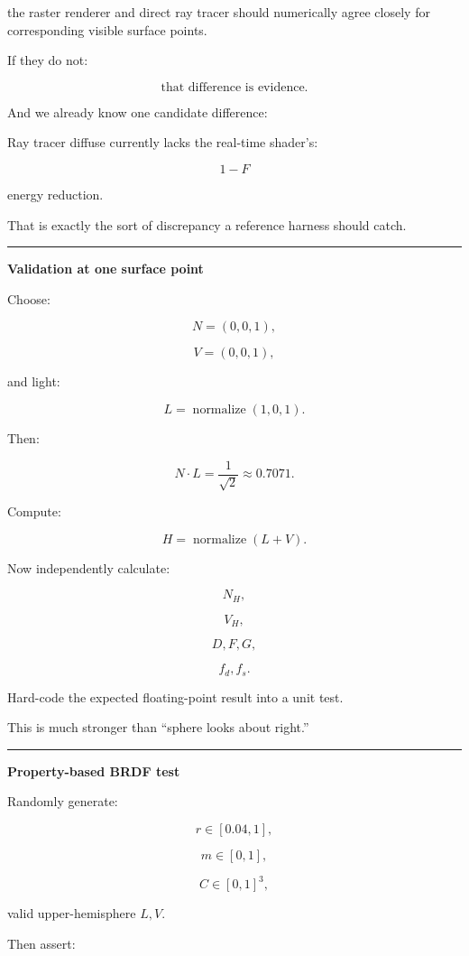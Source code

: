 the raster renderer and direct ray tracer should numerically agree closely for corresponding visible surface points.

If they do not:

\[
\boxed{
\text{that difference is evidence}.
}
\]

And we already know one candidate difference:

Ray tracer diffuse currently lacks the real-time shader's:

\[
1-F
\]

energy reduction.

That is exactly the sort of discrepancy a reference harness should catch.

\begin{center}\rule{0.5\linewidth}{0.5pt}\end{center}

\textbf{Validation at one surface point}

Choose:

\[
N=(0,0,1),
\]

\[
V=(0,0,1),
\]

and light:

\[
L=
\operatorname{normalize}(1,0,1).
\]

Then:

\[
N\cdot L
=
\frac1{\sqrt2}
\approx0.7071.
\]

Compute:

\[
H=
\operatorname{normalize}(L+V).
\]

Now independently calculate:

\[
N_H,
\]

\[
V_H,
\]

\[
D,
F,
G,
\]

\[
f_d,
f_s.
\]

Hard-code the expected floating-point result into a unit test.

This is much stronger than ``sphere looks about right.''

\begin{center}\rule{0.5\linewidth}{0.5pt}\end{center}

\textbf{Property-based BRDF test}

Randomly generate:

\[
r\in[0.04,1],
\]

\[
m\in[0,1],
\]

\[
C\in[0,1]^3,
\]

valid upper-hemisphere \(L,V\).

Then assert:

